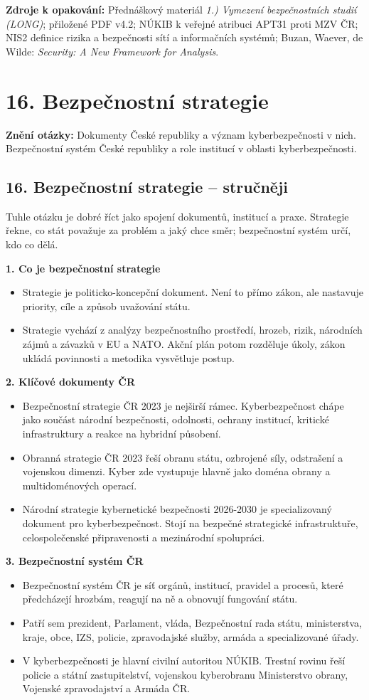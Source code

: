 \documentclass[11pt,a4paper]{article}
\newcommand{\otazka}[3]{\section*{#1}\addcontentsline{toc}{section}{#1}\noindent\textbf{Znění otázky:} #2\par\medskip}
\newcommand{\zdroje}[1]{\medskip\noindent\textbf{Zdroje k opakování:} #1\medskip}
\begin{document}
\zdroje{Přednáškový materiál \emph{1.) Vymezení bezpečnostních studií (LONG)}; přiložené PDF v4.2; NÚKIB k veřejné atribuci APT31 proti MZV ČR; NIS2 definice rizika a bezpečnosti sítí a informačních systémů; Buzan, Waever, de Wilde: \emph{Security: A New Framework for Analysis}.}

\newpage

\otazka{16. Bezpečnostní strategie}{Dokumenty České republiky a význam kyberbezpečnosti v nich. Bezpečnostní systém České republiky a role institucí v oblasti kyberbezpečnosti.}{BSSb1103}

\subsection*{16. Bezpečnostní strategie -- stručněji}
Tuhle otázku je dobré říct jako spojení dokumentů, institucí a praxe. Strategie řekne, co stát považuje za problém a jaký chce směr; bezpečnostní systém určí, kdo co dělá.

\textbf{1. Co je bezpečnostní strategie}
\begin{itemize}
  \item Strategie je politicko-koncepční dokument. Není to přímo zákon, ale nastavuje priority, cíle a způsob uvažování státu.
  \item Strategie vychází z analýzy bezpečnostního prostředí, hrozeb, rizik, národních zájmů a závazků v EU a NATO. Akční plán potom rozděluje úkoly, zákon ukládá povinnosti a metodika vysvětluje postup.
\end{itemize}

\textbf{2. Klíčové dokumenty ČR}
\begin{itemize}
  \item Bezpečnostní strategie ČR 2023 je nejširší rámec. Kyberbezpečnost chápe jako součást národní bezpečnosti, odolnosti, ochrany institucí, kritické infrastruktury a reakce na hybridní působení.
  \item Obranná strategie ČR 2023 řeší obranu státu, ozbrojené síly, odstrašení a vojenskou dimenzi. Kyber zde vystupuje hlavně jako doména obrany a multidoménových operací.
  \item Národní strategie kybernetické bezpečnosti 2026-2030 je specializovaný dokument pro kyberbezpečnost. Stojí na bezpečné strategické infrastruktuře, celospolečenské připravenosti a mezinárodní spolupráci.
\end{itemize}

\textbf{3. Bezpečnostní systém ČR}
\begin{itemize}
  \item Bezpečnostní systém ČR je síť orgánů, institucí, pravidel a procesů, které předcházejí hrozbám, reagují na ně a obnovují fungování státu.
  \item Patří sem prezident, Parlament, vláda, Bezpečnostní rada státu, ministerstva, kraje, obce, IZS, policie, zpravodajské služby, armáda a specializované úřady.
  \item V kyberbezpečnosti je hlavní civilní autoritou NÚKIB. Trestní rovinu řeší policie a státní zastupitelství, vojenskou kyberobranu Ministerstvo obrany, Vojenské zpravodajství a Armáda ČR.
\end{itemize}
\end{document}
